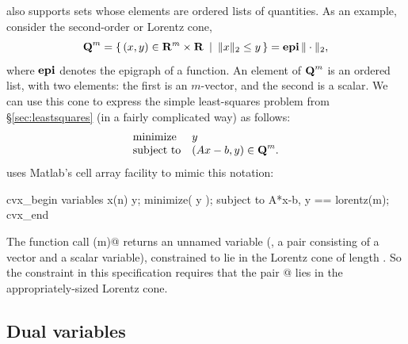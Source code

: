 \documentclass[12pt]{article}
\newcommand{\lorentz}{{\mbox{\bf Q}}}  %
\begin{document}
\cvx also supports sets whose elements are ordered
lists of quantities.  As an example, consider the second-order or 
Lorentz cone,
\begin{equation}
	\lorentz^m = \Condset{ (x,y) \in \R^m\times\R }{ \| x \|_2 \leq y } = \epi \|\cdot\|_2,
\end{equation}
where $\operatorname{\textbf{epi}}$ denotes the epigraph of a function.
An element of $\lorentz^m$ is an ordered list, with two elements:
the first is an $m$-vector, and the second is a scalar.
We can use this cone to express the simple least-squares problem 
from \S\ref{sec:leastsquares} (in a fairly complicated way)
as follows:
\begin{equation}
	\begin{array}{ll}
		\text{minimize}   & y \\
		\text{subject to} & ( A x - b, y ) \in \lorentz^m.
	\end{array}
\end{equation}
\cvx uses Matlab's cell array facility to mimic this notation:
\begin{code}
	cvx_begin
	    variables x(n) y;
	    minimize( y );
	    subject to
	        { A*x-b, y } == lorentz(m);
	cvx_end
\end{code}
The function call \verb@lorentz(m)@ returns
an unnamed variable (\ie, a pair consisting of a vector and a 
scalar variable),
constrained to lie in the Lorentz cone of length \verb@m@. 
So the constraint in this
specification requires that the pair @
lies in the appropriately-sized Lorentz cone.

\subsection{Dual variables}
\end{document}
